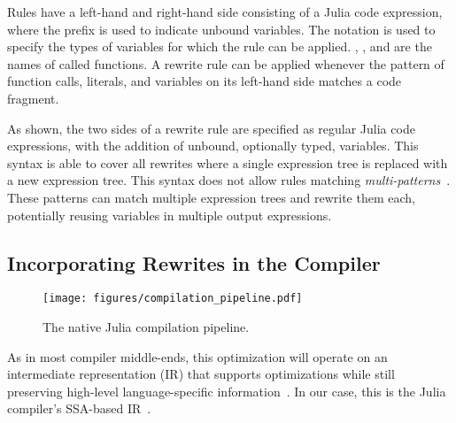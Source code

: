 Rules have a left-hand and right-hand side consisting of a Julia code expression, where the  prefix is used to indicate unbound variables. The \code{::} notation is used to specify the types of variables for which the rule can be applied. , , and  are the names of called functions. A rewrite rule can be applied whenever the pattern of function calls, literals, and variables on its left-hand side matches a code fragment. 

As shown, the two sides of a rewrite rule are specified as regular Julia code expressions, with the addition of unbound, optionally typed, variables.
This syntax is able to cover all rewrites where a single expression tree is replaced with a new expression tree.
This syntax does not allow rules matching \emph{multi-patterns}~\cite{jiaTASOOptimizingDeep2019,MLSYS2021_cc427d93}. These patterns can match multiple expression trees and rewrite them each, potentially reusing variables in multiple output expressions.

\subsection{Incorporating Rewrites in the Compiler}
\label{sec:compiler flow}

\begin{figure}
    \centering
    \texttt{[image: figures/compilation\_pipeline.pdf]}
    \caption{The native Julia compilation pipeline.}
    \label{fig:julia_compilation}
\end{figure}

As in most compiler middle-ends, this optimization will operate on an intermediate representation (IR) that supports optimizations while still preserving high-level language-specific information~\cite{lattnerMLIRCompilerInfrastructure2020,liMirCheckerDetectingBugs2021,swiftSIL}. In our case, this is the Julia compiler's SSA-based IR~\cite{bezansonJuliaFastDynamic2012}. 

